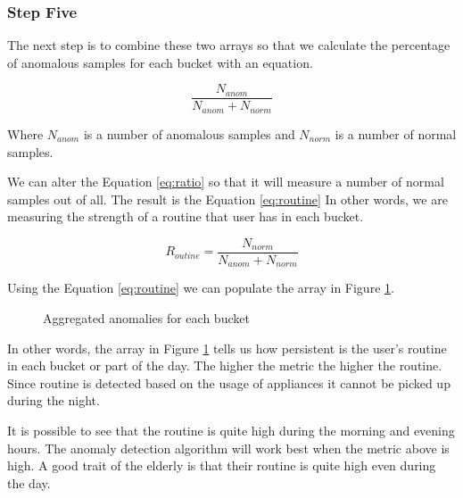 \subsubsection{Step Five}

The next step is to combine these two arrays so that we calculate the percentage of anomalous samples 
for each bucket with an equation. 

\begin{equation}
    \frac{N_{anom}}{N_{anom}+N_{norm}}
    \label{eq:ratio}
\end{equation}

Where $N_{anom}$ is a number of anomalous samples and $N_{norm}$ is a number of normal samples.


We can alter the Equation \ref{eq:ratio} so that it will measure
a number of normal samples out of all. 
The result is the Equation \ref{eq:routine}
In other words, we are measuring the strength of a routine that 
user has in each bucket.

\begin{equation}
    R_{outine}= \frac{N_{norm}}{N_{anom}+N_{norm}}
    \label{eq:routine}
\end{equation}

Using the Equation \ref{eq:routine} we can populate the array in Figure \ref{arr:anom_ratio}.

\begin{figure}[H]
    \centering
    \caption{Aggregated anomalies for each bucket}
    \label{arr:anom_ratio}
\end{figure}

In other words, the array in Figure \ref{arr:anom_ratio} tells us how persistent is the user's routine in each bucket or part of the day. 
The higher the metric the higher the routine. 
Since routine is detected based on the usage of appliances it cannot be picked up during the night.

It is possible to see that the routine is quite high during the morning and evening hours.
The anomaly detection algorithm will work best when the metric above is high.
A good trait of the elderly is that their routine is quite high even during the day.

